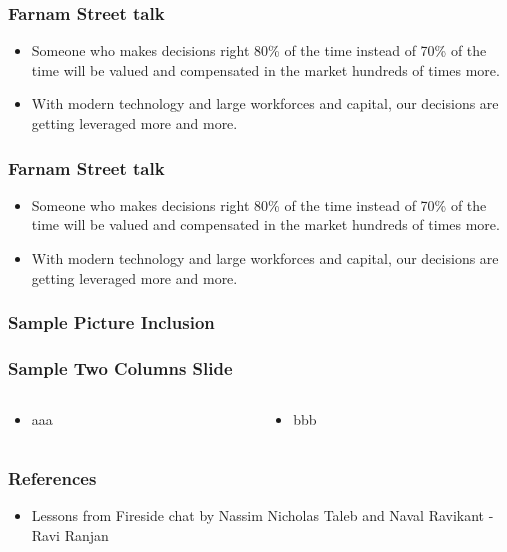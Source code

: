 \begin{frame}[fragile]\frametitle{Farnam Street talk}

\begin{itemize}
\item Someone who makes decisions right 80\% of the time instead of 70\% of the time will be valued and compensated in the market hundreds of times more. 
\item With modern technology and large workforces and capital, our decisions are getting leveraged more and more.
\end{itemize}

\end{frame}

\begin{frame}[fragile]\frametitle{Farnam Street talk}

\begin{itemize}
\item Someone who makes decisions right 80\% of the time instead of 70\% of the time will be valued and compensated in the market hundreds of times more. 
\item With modern technology and large workforces and capital, our decisions are getting leveraged more and more.
\end{itemize}

\end{frame}

\begin{frame}[fragile]\frametitle{Sample Picture Inclusion}

\end{frame}


\begin{frame}[fragile]\frametitle{Sample Two Columns Slide}
\begin{columns}
    \begin{column}[T]{0.6\linewidth}
      \begin{itemize}
		\item aaa
	  \end{itemize}

    \end{column}
    \begin{column}[T]{0.4\linewidth}
      \begin{itemize}
		\item bbb
	  \end{itemize}
    \end{column}
  \end{columns}
\end{frame}

\begin{frame}[fragile]\frametitle{References}
\begin{itemize}
\item Lessons from Fireside chat by Nassim Nicholas Taleb and Naval Ravikant
- Ravi Ranjan
\end{itemize}
\end{frame}
